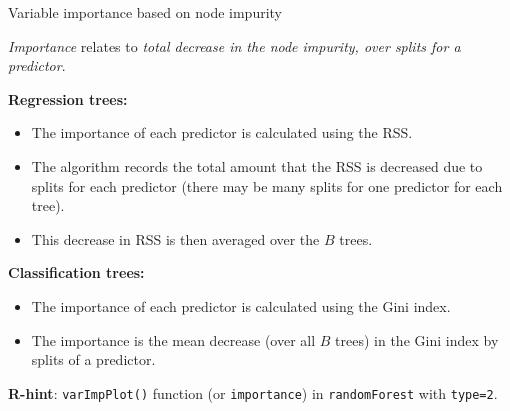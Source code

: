 \documentclass[
  10pt,
  ignorenonframetext,
]{beamer}
\providecommand{\tightlist}{%
  \setlength{\itemsep}{0pt}\setlength{\parskip}{0pt}}
\begin{document}
\begin{frame}[fragile]
\begin{block}{Variable importance based on node impurity}
\protect\hypertarget{variable-importance-based-on-node-impurity}{}
\vspace{1mm}

\emph{Importance} relates to \emph{total decrease in the node impurity,
over splits for a predictor}.

\vspace{4mm}

\textbf{Regression trees:}

\begin{itemize}
\tightlist
\item
  The importance of each predictor is calculated using the RSS.
\item
  The algorithm records the total amount that the RSS is decreased due
  to splits for each predictor (there may be many splits for one
  predictor for each tree).
\item
  This decrease in RSS is then averaged over the \(B\) trees.
\end{itemize}

\vspace{2mm}

\textbf{Classification trees:}

\begin{itemize}
\tightlist
\item
  The importance of each predictor is calculated using the Gini index.
\item
  The importance is the mean decrease (over all \(B\) trees) in the Gini
  index by splits of a predictor.
\end{itemize}

\vspace{3mm}

\textbf{R-hint}: \texttt{varImpPlot()} function (or \texttt{importance})
in \texttt{randomForest} with \texttt{type=2}.
\end{block}
\end{frame}
\end{document}
